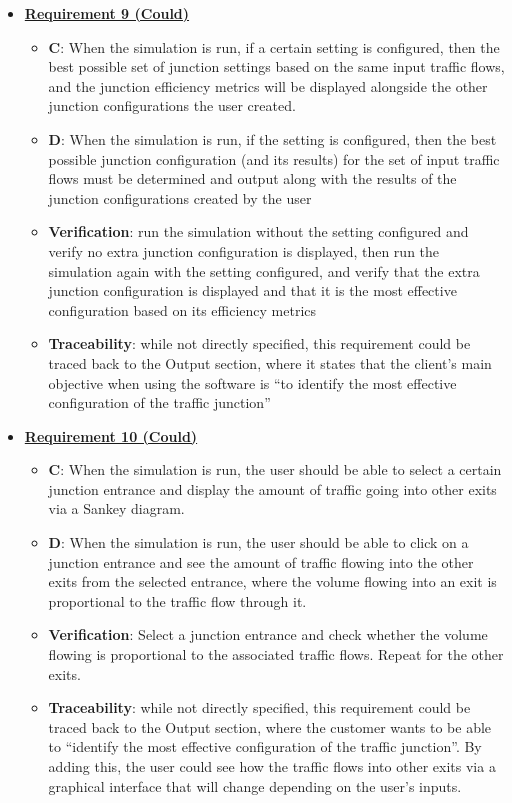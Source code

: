 \documentclass{article}
\begin{document}
\begin{itemize}
    \item \textbf{\underline{Requirement 9 (Could)}}
    \begin{itemize}
        \item \textbf{C}: When the simulation is run, if a certain setting is configured, then the best 
            possible set of junction settings based on the same input traffic flows, and the 
            junction efficiency metrics will be displayed alongside the other junction 
            configurations the user created.
        \item \textbf{D}: When the simulation is run, if the setting is configured, then the best 
            possible junction configuration (and its results) for the set of input traffic 
            flows must be determined and output along with the results of the junction 
            configurations created by the user
        \item \textbf{Verification}: run the simulation without the setting configured and verify 
            no extra junction configuration is displayed, then run the simulation again with 
            the setting configured, and verify that the extra junction configuration is displayed 
            and that it is the most effective configuration based on its efficiency metrics
        \item\textbf{Traceability}: while not directly specified, this requirement could be traced back 
            to the Output section, where it states that the client’s main objective when using 
            the software is “to identify the most effective configuration of the traffic junction”
    \end{itemize}

    \item \textbf{\underline{Requirement 10 (Could)}}
    \begin{itemize}
        \item \textbf{C}: When the simulation is run, the user should be able to select a certain junction entrance 
            and display the amount of traffic going into other exits via a 
            Sankey diagram.
        \item \textbf{D}: When the simulation is run, the user should be able to click on a junction entrance and see 
            the amount of traffic flowing into the other exits from the selected entrance, where the volume 
            flowing into an exit is proportional to the traffic flow through it.
        \item \textbf{Verification}: Select a junction entrance and check whether the volume flowing
            is proportional to the associated traffic flows. Repeat for the other exits.
        \item\textbf{Traceability}: while not directly specified, this requirement could be traced back 
            to the Output section, where the customer wants to be able to “identify the most effective 
            configuration of the traffic junction”. By adding this, the user could see how the traffic 
            flows into other exits via a graphical interface that will change depending on the user's 
            inputs.
    \end{itemize}


\end{itemize}
\end{document}
